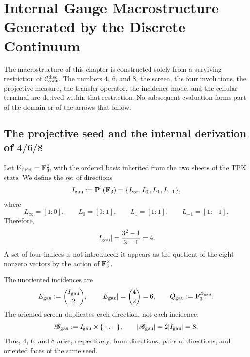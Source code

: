 \iffalse
\chapter[Internal Gauge Macrostructure]{Internal Gauge Macrostructure Generated by the Discrete Continuum}
\label{chap:gauint-macroestructura}

\begin{thesisbox}
The macrostructure of this chapter is constructed solely from a
surviving restriction of \(\mathcal C_{\rm cont}^{\rm disc}\). The numbers
\(4\), \(6\), and \(8\), the screen, the four involutions, the
projective measure, the transfer operator, the incidence mode, and the cellular
terminal are derived within that restriction. No subsequent evaluation
forms part of the domain or of the arrows that follow.
\end{thesisbox}

\section{The projective seed and the internal derivation of \texorpdfstring{\(4/6/8\)}{4/6/8}}

Let \(V_{\rm TPK}=\mathbf F_3^2\), with the ordered basis inherited from the two
sheets of the TPK state. We define the set of directions
\begin{equation}\label{eq:gauint-cuatro-direcciones}
 I_{\rm gau}:=\mathbf P^1(\mathbf F_3)
 =\{L_\infty,L_0,L_1,L_{-1}\},
\end{equation}
where
\[
 L_\infty=[1:0],\qquad L_0=[0:1],\qquad
 L_1=[1:1],\qquad L_{-1}=[1:-1].
\]
Therefore,
\begin{equation}\label{eq:gauint-cardinal-cuatro}
 |I_{\rm gau}|=\frac{3^2-1}{3-1}=4.
\end{equation}
A set of four indices is not introduced: it appears as the quotient of
the eight nonzero vectors by the action of \(\mathbf F_3^\times\).

The unoriented incidences are
\begin{equation}\label{eq:gauint-seis-incidencias}
 E_{\rm gau}:=\binom{I_{\rm gau}}2,
 \qquad |E_{\rm gau}|=\binom42=6,
 \qquad Q_{\rm gau}:=\mathbf F_3^{E_{\rm gau}}.
\end{equation}
The oriented screen duplicates each direction, not each incidence:
\begin{equation}\label{eq:gauint-ocho-caras}
 \mathscr B_{\rm gau}:=I_{\rm gau}\times\{+,-\},
 \qquad |\mathscr B_{\rm gau}|=2|I_{\rm gau}|=8.
\end{equation}
Thus, \(4\), \(6\), and \(8\) arise, respectively, from directions, pairs of
directions, and oriented faces of the same seed.

